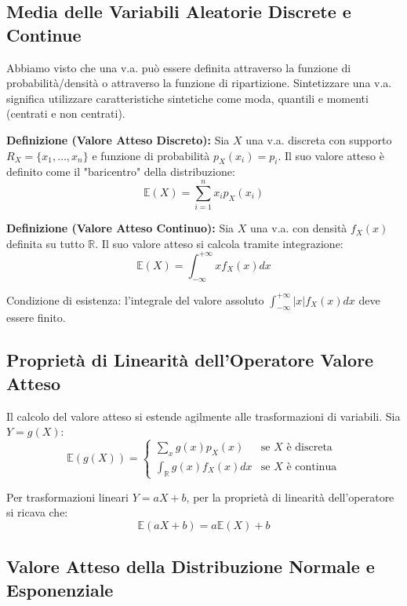 \documentclass[12pt, a4paper]{article}
\begin{document}
\subsection{Media delle Variabili Aleatorie Discrete e Continue}
Abbiamo visto che una v.a. può essere definita attraverso la funzione di probabilità/densità o attraverso la funzione di ripartizione. Sintetizzare una v.a. significa utilizzare caratteristiche sintetiche come moda, quantili e momenti (centrati e non centrati).

\textbf{Definizione (Valore Atteso Discreto):} Sia $X$ una v.a. discreta con supporto $R_X=\{x_1, \dots, x_n\}$ e funzione di probabilità $p_X(x_i) = p_i$. Il suo valore atteso è definito come il "baricentro" della distribuzione:
$$ \mathbb{E}(X) = \sum_{i=1}^n x_i p_X(x_i) $$

\textbf{Definizione (Valore Atteso Continuo):} Sia $X$ una v.a. con densità $f_X(x)$ definita su tutto $\mathbb{R}$. Il suo valore atteso si calcola tramite integrazione:
$$ \mathbb{E}(X) = \int_{-\infty}^{+\infty} x f_X(x) dx $$

Condizione di esistenza: l'integrale del valore assoluto $\int_{-\infty}^{+\infty} |x| f_X(x) dx$ deve essere finito.

\subsection{Proprietà di Linearità dell'Operatore Valore Atteso}
Il calcolo del valore atteso si estende agilmente alle trasformazioni di variabili. Sia $Y = g(X)$:
$$ \mathbb{E}(g(X)) = \begin{cases} \sum_{x} g(x) p_X(x) & \text{se } X \text{ è discreta} \\ \int_{\mathbb{R}} g(x) f_X(x) dx & \text{se } X \text{ è continua} \end{cases} $$

Per trasformazioni lineari $Y = aX + b$, per la proprietà di linearità dell'operatore si ricava che:
$$ \mathbb{E}(aX + b) = a\mathbb{E}(X) + b $$

\subsection{Valore Atteso della Distribuzione Normale e Esponenziale}
\end{document}

